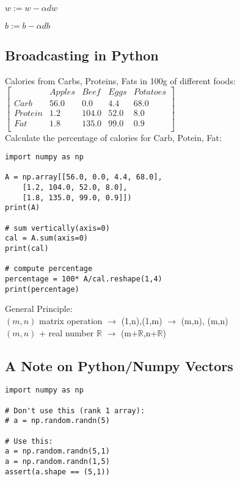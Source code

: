 \documentclass{article}
\begin{document}
$w := w-\alpha dw$\

$b := b-\alpha db$\\

\newpage
\subsection{Broadcasting in Python}

Calories from Carbs, Proteins, Fats in 100g of different foods: \\

$\begin{bmatrix}
& Apples & Beef & Eggs & Potatoes \\
Carb & 56.0 & 0.0 & 4.4 & 68.0 \\
Protein & 1.2 & 104.0 & 52.0 & 8.0 \\
Fat & 1.8 & 135.0 & 99.0 & 0.9 \\
\end{bmatrix}$\\

Calculate the percentage of calories for Carb, Potein, Fat:\\

\lstset{language=Python}
\begin{lstlisting}
import numpy as np

A = np.array[[56.0, 0.0, 4.4, 68.0],
    [1.2, 104.0, 52.0, 8.0],
    [1.8, 135.0, 99.0, 0.9]])
print(A)

# sum vertically(axis=0)
cal = A.sum(axis=0)
print(cal)

# compute percentage
percentage = 100* A/cal.reshape(1,4)
print(percentage)
\end{lstlisting}


General Principle:\\

$(m,n)$ matrix operation $\rightarrow$ (1,n),(1,m) $\rightarrow$ (m,n), (m,n)\\

$(m,n)$ + real number $\mathbb{R}$ $\rightarrow$ (m+$\mathbb{R}$,n+$\mathbb{R}$)\\

\newpage
\subsection{A Note on Python/Numpy Vectors}

\lstset{language=Python}
\begin{lstlisting}
import numpy as np

# Don't use this (rank 1 array):
# a = np.random.randn(5)

# Use this:
a = np.random.randn(5,1)
a = np.random.randn(1,5)
assert(a.shape == (5,1))
\end{lstlisting}
\end{document}
